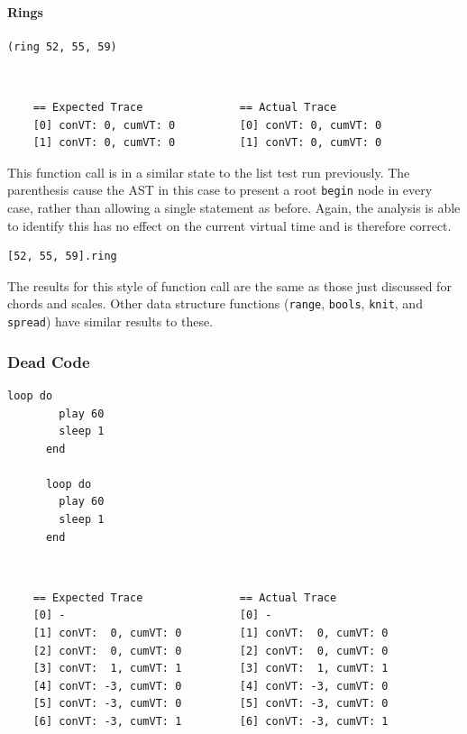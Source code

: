 \documentclass[11pt, abstracton, twoside, titlepage=true]{scrartcl}
\begin{document}
\paragraph{Rings}
\begin{minipage}{\textwidth}
	\begin{lstlisting}[style = sonicpi]
      (ring 52, 55, 59)
	\end{lstlisting}
\end{minipage}
\\
\begin{lstlisting}
    == Expected Trace               == Actual Trace
    [0] conVT: 0, cumVT: 0          [0] conVT: 0, cumVT: 0
    [1] conVT: 0, cumVT: 0          [1] conVT: 0, cumVT: 0
\end{lstlisting}

This function call is in a similar state to the list test run previously. The 
parenthesis cause the AST in this case to present a root \texttt{begin} node in 
every case, rather than allowing a single statement as before. Again, the analysis 
is able to identify this has no effect on the current virtual time and is therefore 
correct. 

\begin{minipage}{\textwidth}
	\begin{lstlisting}[style = sonicpi]
      [52, 55, 59].ring
	\end{lstlisting}
\end{minipage}

The results for this style of function call are the same as those just discussed 
for chords and scales. Other data structure functions (\texttt{range}, 
\texttt{bools}, \texttt{knit}, and \texttt{spread}) have similar results to 
these.

\subsubsection{Dead Code}
\begin{minipage}{\textwidth}
	\begin{lstlisting}[style = sonicpi]
      loop do
        play 60
        sleep 1
      end

      loop do
        play 60
        sleep 1
      end
	\end{lstlisting}
\end{minipage}
\\
\begin{lstlisting}
    == Expected Trace               == Actual Trace
    [0] -                           [0] -
    [1] conVT:  0, cumVT: 0         [1] conVT:  0, cumVT: 0
    [2] conVT:  0, cumVT: 0         [2] conVT:  0, cumVT: 0
    [3] conVT:  1, cumVT: 1         [3] conVT:  1, cumVT: 1
    [4] conVT: -3, cumVT: 0         [4] conVT: -3, cumVT: 0
    [5] conVT: -3, cumVT: 0         [5] conVT: -3, cumVT: 0
    [6] conVT: -3, cumVT: 1         [6] conVT: -3, cumVT: 1
\end{lstlisting}
\end{document}
